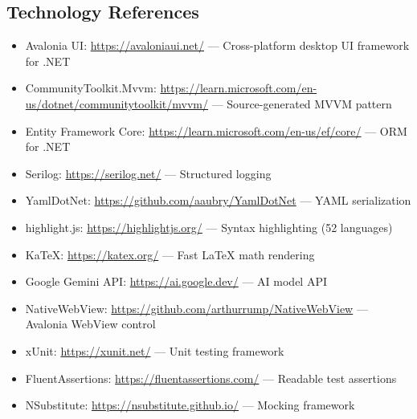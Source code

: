 \documentclass[14pt]{article}
\begin{document}
\subsection{Technology References}
\label{sec:orgbf2c3d6}
\begin{itemize}
\item Avalonia UI: \url{https://avaloniaui.net/} — Cross-platform desktop UI
framework for .NET
\item CommunityToolkit.Mvvm: \url{https://learn.microsoft.com/en-us/dotnet/communitytoolkit/mvvm/}
— Source-generated MVVM pattern
\item Entity Framework Core: \url{https://learn.microsoft.com/en-us/ef/core/}
— ORM for .NET
\item Serilog: \url{https://serilog.net/} — Structured logging
\item YamlDotNet: \url{https://github.com/aaubry/YamlDotNet} — YAML serialization
\item highlight.js: \url{https://highlightjs.org/} — Syntax highlighting (52 languages)
\item KaTeX: \url{https://katex.org/} — Fast \LaTeX{} math rendering
\item Google Gemini API: \url{https://ai.google.dev/} — AI model API
\item NativeWebView: \url{https://github.com/arthurrump/NativeWebView} —
Avalonia WebView control
\item xUnit: \url{https://xunit.net/} — Unit testing framework
\item FluentAssertions: \url{https://fluentassertions.com/} — Readable test assertions
\item NSubstitute: \url{https://nsubstitute.github.io/} — Mocking framework
\end{itemize}

\newpage
\end{document}
